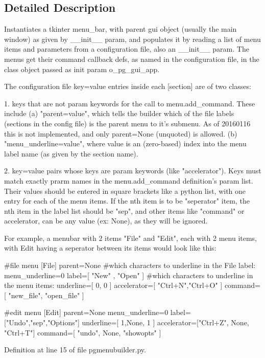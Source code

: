 \subsection{Detailed Description}
\begin{DoxyVerb}Instantiates a tkinter menu_bar, with parent gui object (usually the main window) 
as given by __init__ param, and populates it by reading a list of menu items and 
parameters from a configuration file, also an __init__ param. The menus get their 
command callback defs, as named in the configuration file, in the class object 
passed as init param o_pg_gui_app.

The configuration file key=value entries inside each [section] are of two classes:

1. keys that are not param keywords for the call to menu.add_command.  These include 
    (a) "parent=value", which tells the
    builder which of the file labels (sections in the config file) is the parent menu
    to it's submenu.  As of 20160116 this is not implemented, and only parent=None (unquoted) 
    is allowed.
    (b) "menu_underline=value", where value is an (zero-based) index into the menu label name 
    (as given by the section name).

2. key=value pairs whose keys are param keywords (like "accelerator").  Keys must match exactly
    prarm names in the menu.add_command definition's param list.  Their values should be 
    entered in square brackets like a python list, with one entry for each of the menu items.  
    If the nth item is to be "seperator" item, the nth item in the label list should be 
    "sep", and other items like "command" or accelerator, can be any value (ex: None), 
    as they will be ignored.

For example, a menubar with 2 items "File" and "Edit", each with 2 menu items, with
Edit having a seperator between its items would look like this: 

#file menu
[File]
parent=None
#which characters to underline in the File label:
menu_underline=0
label=[ "New" , "Open" ]
#which characters to underline in the menu items:
underline=[ 0, 0 ]
accelerator=[ "Ctrl+N","Ctrl+O" ]
command=[ "new_file", "open_file" ]

#edit menu
[Edit]
parent=None
menu_underline=0
label=["Undo","sep","Options"]
underline=[ 1,None, 1 ]
accelerator=["Ctrl+Z", None, "Ctrl+T"]
command=[ "undo", None, "showopts" ]  
\end{DoxyVerb}
 

Definition at line 15 of file pgmenubuilder.\+py.



